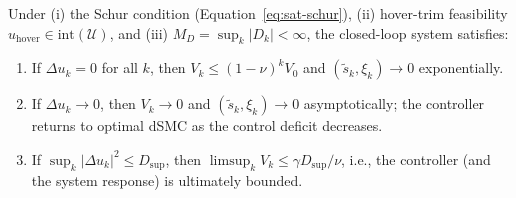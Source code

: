 \documentclass[conf]{new-aiaa}
\begin{document}
Under (i) the Schur condition (Equation~\ref{eq:sat-schur}), (ii) hover-trim feasibility $u_{\mathrm{hover}} \in \mathrm{int}(\mathcal{U})$, and (iii) $M_D = \sup_k |D_k| < \infty$, the closed-loop system satisfies:
\begin{enumerate}
\item If $\Delta u_k = 0$ for all $k$, then $V_k \leq (1 - \nu)^k V_0$ and $(\tilde s_k, \xi_k) \to 0$ exponentially.
\item If $\Delta u_k \to 0$, then $V_k \to 0$ and $(\tilde s_k, \xi_k) \to 0$ asymptotically; the controller returns to optimal dSMC as the control deficit decreases. 
\item If $\sup_k |\Delta u_k|^2 \leq D_{\sup}$, then $\limsup_k V_k \leq \gamma D_{\sup}/\nu$, i.e., the controller (and the system response) is ultimately bounded.
\end{enumerate}
\end{document}
